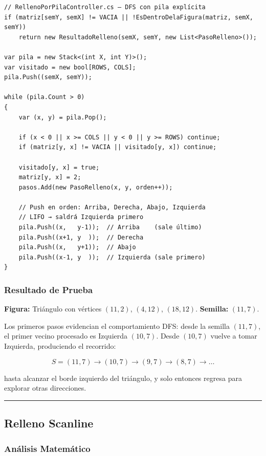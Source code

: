 \documentclass[
  spanish,
  a4paper,
  12pt,
]{article}
\begin{document}
\begin{lstlisting}
// RellenoPorPilaController.cs — DFS con pila explícita
if (matriz[semY, semX] != VACIA || !EsDentroDelaFigura(matriz, semX, semY))
    return new ResultadoRelleno(semX, semY, new List<PasoRelleno>());

var pila = new Stack<(int X, int Y)>();
var visitado = new bool[ROWS, COLS];
pila.Push((semX, semY));

while (pila.Count > 0)
{
    var (x, y) = pila.Pop();

    if (x < 0 || x >= COLS || y < 0 || y >= ROWS) continue;
    if (matriz[y, x] != VACIA || visitado[y, x]) continue;

    visitado[y, x] = true;
    matriz[y, x] = 2;
    pasos.Add(new PasoRelleno(x, y, orden++));

    // Push en orden: Arriba, Derecha, Abajo, Izquierda
    // LIFO → saldrá Izquierda primero
    pila.Push((x,   y-1));  // Arriba    (sale último)
    pila.Push((x+1, y  ));  // Derecha
    pila.Push((x,   y+1));  // Abajo
    pila.Push((x-1, y  ));  // Izquierda (sale primero)
}
\end{lstlisting}

\subsubsection{Resultado de Prueba}\label{resultado-de-prueba-7}

\textbf{Figura:} Triángulo con vértices \((11,2)\), \((4,12)\),
\((18,12)\). \textbf{Semilla:} \((11, 7)\).

Los primeros pasos evidencian el comportamiento DFS: desde la semilla
\((11,7)\), el primer vecino procesado es Izquierda \((10,7)\). Desde
\((10,7)\) vuelve a tomar Izquierda, produciendo el recorrido:

\[S=(11,7) \to (10,7) \to (9,7) \to (8,7) \to \ldots\]

hasta alcanzar el borde izquierdo del triángulo, y solo entonces regresa
para explorar otras direcciones.

\begin{center}\rule{0.5\linewidth}{0.5pt}\end{center}

\subsection{Relleno Scanline}\label{relleno-scanline}

\subsubsection{Análisis
Matemático}\label{anuxe1lisis-matemuxe1tico-8}
\end{document}
